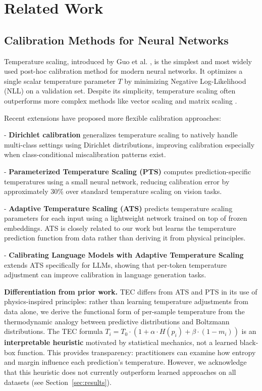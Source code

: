 \documentclass[11pt,letterpaper]{article}
\begin{document}
\section{Related Work}

\subsection{Calibration Methods for Neural Networks}

Temperature scaling, introduced by Guo et al. \cite{Guo2017}, is the simplest and most widely used post-hoc calibration method for modern neural networks. It optimizes a single scalar temperature parameter $T$ by minimizing Negative Log-Likelihood (NLL) on a validation set. Despite its simplicity, temperature scaling often outperforms more complex methods like vector scaling and matrix scaling \cite{Guo2017}.

Recent extensions have proposed more flexible calibration approaches:

- \textbf{Dirichlet calibration} \cite{Kull2019} generalizes temperature scaling to natively handle multi-class settings using Dirichlet distributions, improving calibration especially when class-conditional miscalibration patterns exist.

- \textbf{Parameterized Temperature Scaling (PTS)} \cite{Tomani2021} computes prediction-specific temperatures using a small neural network, reducing calibration error by approximately 30\% over standard temperature scaling on vision tasks.

- \textbf{Adaptive Temperature Scaling (ATS)} \cite{Joy2023} predicts temperature scaling parameters for each input using a lightweight network trained on top of frozen embeddings. ATS is closely related to our work but learns the temperature prediction function from data rather than deriving it from physical principles.

- \textbf{Calibrating Language Models with Adaptive Temperature Scaling} \cite{Xie2024} extends ATS specifically for LLMs, showing that per-token temperature adjustment can improve calibration in language generation tasks.

\textbf{Differentiation from prior work.} TEC differs from ATS \cite{Joy2023} and PTS \cite{Tomani2021} in its use of physics-inspired principles: rather than learning temperature adjustments from data alone, we derive the functional form of per-sample temperature from the thermodynamic analogy between predictive distributions and Boltzmann distributions. The TEC formula $T_i = T_0 \cdot (1 + \alpha \cdot H(p_i) + \beta \cdot (1 - m_i))$ is an \textbf{interpretable heuristic} motivated by statistical mechanics, not a learned black-box function. This provides transparency: practitioners can examine how entropy and margin influence each prediction's temperature. However, we acknowledge that this heuristic does not currently outperform learned approaches on all datasets (see Section~\ref{sec:results}).
\end{document}

